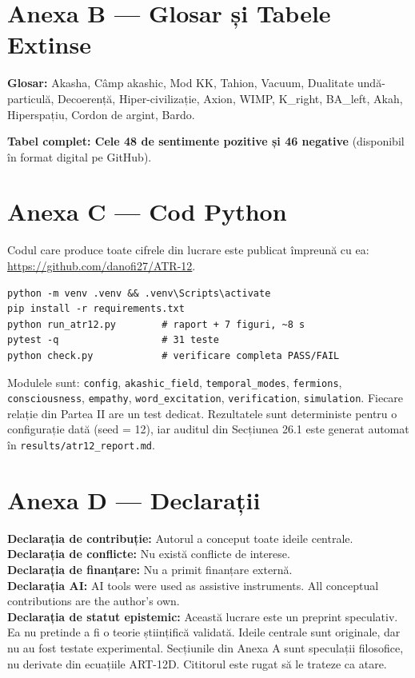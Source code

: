 \documentclass[11pt,a4paper]{article}
\begin{document}
\section{Anexa B — Glosar și Tabele Extinse}
\textbf{Glosar:} Akasha, Câmp akashic, Mod KK, Tahion, Vacuum, Dualitate undă-particulă, Decoerență, Hiper-civilizație, Axion, WIMP, K\_right, BA\_left, Akah, Hiperspațiu, Cordon de argint, Bardo.

\textbf{Tabel complet: Cele 48 de sentimente pozitive și 46 negative} (disponibil în format digital pe GitHub).

\section{Anexa C — Cod Python}
Codul care produce toate cifrele din lucrare este publicat împreună cu ea: \url{https://github.com/danofi27/ATR-12}.

\begin{verbatim}
python -m venv .venv && .venv\Scripts\activate
pip install -r requirements.txt
python run_atr12.py        # raport + 7 figuri, ~8 s
pytest -q                  # 31 teste
python check.py            # verificare completa PASS/FAIL
\end{verbatim}

Modulele sunt: \texttt{config}, \texttt{akashic\_field}, \texttt{temporal\_modes}, \texttt{fermions}, \texttt{consciousness}, \texttt{empathy}, \texttt{word\_excitation}, \texttt{verification}, \texttt{simulation}. Fiecare relație din Partea II are un test dedicat. Rezultatele sunt deterministe pentru o configurație dată (seed = 12), iar auditul din Secțiunea 26.1 este generat automat în \texttt{results/atr12\_report.md}.

\section{Anexa D — Declarații}
\textbf{Declarația de contribuție:} Autorul a conceput toate ideile centrale. \\
\textbf{Declarația de conflicte:} Nu există conflicte de interese. \\
\textbf{Declarația de finanțare:} Nu a primit finanțare externă. \\
\textbf{Declarația AI:} AI tools were used as assistive instruments. All conceptual contributions are the author's own. \\
\textbf{Declarația de statut epistemic:} Această lucrare este un preprint speculativ. Ea nu pretinde a fi o teorie științifică validată. Ideile centrale sunt originale, dar nu au fost testate experimental. Secțiunile din Anexa A sunt speculații filosofice, nu derivate din ecuațiile ART-12D. Cititorul este rugat să le trateze ca atare.
\end{document}
